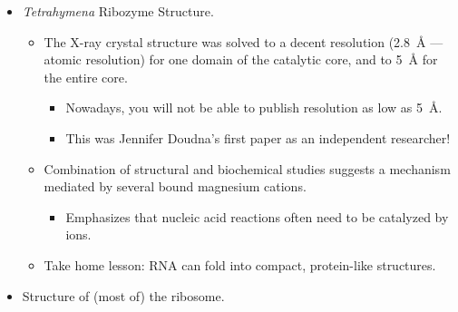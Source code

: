 \documentclass[../notes.tex]{subfiles}
\begin{document}
\begin{itemize}
\begin{itemize}
\begin{itemize}
            \item The partially free RNA pice adds more of the original RNA to itself and finally detaches.
        \end{itemize}
        \item Tom Cech (discoverer) believed that protein was catalyzing the reaction.
        \begin{itemize}
            \item Tried denaturing enzymes and heat, but the reaction still proceeded. Strongly suggested it wasn't a protein, but couldn't confirm it wasn't a heat-resistant or otherwise very stable protein (or trace amounts of a highly efficient protein catalyst).
            \item Final clue: Went to an \emph{in vitro} system. Did \emph{in vitro} transcription to get the RNA and RNA only (the material is no longer distilled from the organism), dumped that into the reaction, added the substrate, and watched it occur.
            \item Took them a year.
        \end{itemize}
    \end{itemize}
    \item \emph{Tetrahymena} Ribozyme Structure.
    \begin{itemize}
        \item The X-ray crystal structure was solved to a decent resolution (\SI{2.8}{\angstrom} --- atomic resolution) for one domain of the catalytic core, and to \SI{5}{\angstrom} for the entire core.
        \begin{itemize}
            \item Nowadays, you will not be able to publish resolution as low as \SI{5}{\angstrom}.
            \item This was Jennifer Doudna's first paper as an independent researcher!
        \end{itemize}
        \item Combination of structural and biochemical studies suggests a mechanism mediated by several bound magnesium cations.
        \begin{itemize}
            \item Emphasizes that nucleic acid reactions often need to be catalyzed by ions.
        \end{itemize}
        \item Take home lesson: RNA can fold into compact, protein-like structures.
    \end{itemize}
    \item Structure of (most of) the ribosome.

\end{itemize}
\end{document}

